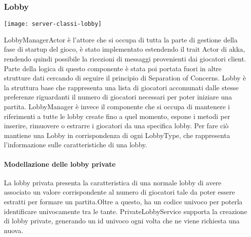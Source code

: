 \subsubsection{Lobby}
\begin{center}
    \texttt{[image: server-classi-lobby]}
\end{center}
LobbyManagerActor è l’attore che si occupa di tutta la parte di gestione della fase di startup del gioco, è stato implementato estendendo il trait Actor di akka, rendendo quindi possibile la ricezioni di messaggi provenienti dai giocatori client.
Parte della logica di questo componente è stata poi portata fuori in altre strutture dati cercando di seguire il principio di Separation of Concerns.
Lobby è la struttura base che rappresenta una lista di giocatori accomunati dalle stesse preferenze riguardanti il numero di giocatori necessari per poter iniziare una partita.
LobbyManager è invece il componente che si occupa di mantenere i riferimenti a tutte le lobby create fino a quel momento, espone i metodi per inserire, rimuovere o estrarre i giocatori da una specifica lobby.
Per fare ciò mantiene una Lobby in corrispondenza di ogni LobbyType, che rappresenta l’informazione sulle caratteristiche di una lobby.

\paragraph{Modellazione delle lobby private}
La lobby privata presenta la caratteristica di una normale lobby di avere associato un valore corrispondente al numero di giocatori tale da poter essere estratti per formare un partita.Oltre a questo, ha un codice univoco per poterla identificare univocamente tra le tante.
PrivateLobbyService supporta la creazione di lobby private, generando un id univoco ogni volta che ne viene richiesta una nuova.
\newpage
